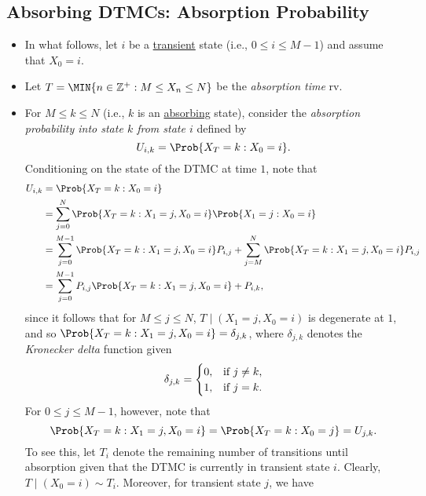 \subsection*{Absorbing DTMCs: Absorption Probability}
\begin{itemize}
    \item In what follows, let $ i $ be a \underline{transient} state (i.e., $ 0\le i\le M-1 $) and assume that $ X_0=i $.
    \item Let $ T=\MIN{n\in\mathbb{Z}^+:M\le X_n\le N} $ be the \emph{absorption time} rv.
    \item For $ M\le k\le N $ (i.e., $k$ is an \underline{absorbing} state), consider the \emph{absorption probability into state $k$
              from state $i$} defined by
          \[ U_{i,k}=\Prob{X_T=k\given X_0=i}. \]
          Conditioning on the state of the DTMC at time $1$, note that
          \begin{align*}
              U_{i, k}
               & =\Prob{X_{T}=k \given X_{0}=i}                                                                                                   \\
               & =\sum_{j=0}^{N} \Prob{X_{T}=k \given X_{1}=j, X_{0}=i} \Prob{X_{1}=j \given X_{0}=i}                                             \\
               & =\sum_{j=0}^{M-1} \Prob{X_{T}=k \given X_{1}=j, X_{0}=i} P_{i, j}+\sum_{j=M}^{N} \Prob{X_{T}=k \given X_{1}=j, X_{0}=i} P_{i, j} \\
               & =\sum_{j=0}^{M-1} P_{i, j} \Prob{X_{T}=k \given X_{1}=j, X_{0}=i}+P_{i, k},
          \end{align*}
          since it follows that for $ M\le j\le N $, $ T\mid(X_1=j,X_0=i) $ is degenerate at $1$, and so
          $ \Prob{X_T=k\given X_1=j,X_0=i}=\delta_{j,k} $, where $ \delta_{j,k} $ denotes the \emph{Kronecker delta} function given
          \[ \delta_{j,k}=\begin{cases}
                  0, & \text{if $ j\ne k $}, \\
                  1, & \text{if $ j=k $}.
              \end{cases} \]
          For $ 0\le j\le M-1 $, however, note that
          \[ \Prob{X_T=k\given X_1=j,X_0=i}=\Prob{X_T=k\given X_0=j}=U_{j,k}. \]
          To see this, let $T_i$ denote the remaining number of transitions until absorption given that the
          DTMC is currently in transient state $i$. Clearly, $ T\mid(X_0=i)\sim T_i $. Moreover, for transient state $ j $, we have

\end{itemize}
